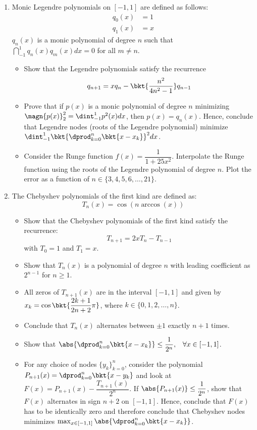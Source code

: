 \documentclass{article}
\begin{document}
	\begin{enumerate}
		\item
		Monic Legendre polynomials on $[-1,1]$ are defined as follows:
		\begin{align}
			q_0(x) & = 1\\
			q_1(x) & = x
		\end{align}
		$q_n(x)$ is a monic polynomial of degree $n$ such that $\dint_{-1}^1 q_n(x) q_m(x)dx = 0$ for all $m \neq n$.
		\begin{itemize}
			\item
			Show that the Legendre polynomials satisfy the recurrence
			$$q_{n+1} = xq_n - \bkt{\dfrac{n^2}{4n^2-1}}q_{n-1}$$
			\item
			Prove that if $p(x)$ is a monic polynomial of degree $n$ minimizing $\magn{p(x)}_2^2 = \dint_{-1}^1 p^2(x)dx$, then $p(x) = q_n(x)$. Hence, conclude that Legendre nodes (roots of the Legendre polynomial) minimize $\dint_{-1}^1\bkt{\dprod_{k=0}^n \bkt{x-x_k}}^2 dx$.
			\item
			Consider the Runge function $f(x) = \dfrac1{1+25x^2}$. Interpolate the Runge function using the roots of the Legendre polynomial of degree $n$. Plot the error as a function of $n \in \{3,4,5,6,\ldots,21\}$.
		\end{itemize}
		\item
		The Chebyshev polynomials of the first kind are defined as:
		$$T_n(x) = \cos(n \arccos(x))$$
		\begin{itemize}
			\item
			Show that the Chebyshev polynomials of the first kind satisfy the recurrence:
			$$T_{n+1} = 2xT_n - T_{n-1}$$
			with $T_0 = 1$ and $T_1 = x$.
			\item
			Show that $T_n(x)$ is a polynomial of degree $n$ with leading coefficient as $2^{n-1}$ for $n \geq 1$.
			\item
			All zeros of $T_{n+1}(x)$ are in the interval $[-1,1]$ and given by $x_k = \cos\bkt{\dfrac{2k+1}{2n+2}\pi}$, where $k \in \{0,1,2,\ldots,n\}$.
			\item
			Conclude that $T_n(x)$ alternates between $\pm1$ exactly $n+1$ times.
			\item
			Show that $\abs{\dprod_{k=0}^n \bkt{x-x_k}} \leq \dfrac1{2^n}, \,\,\,\,\, \forall x \in [-1,1]$.
			\item
			For any choice of nodes $\{y_k\}_{k=0}^n$, consider the polynomial $P_{n+1}(x) = \dprod_{k=0}^n \bkt{x-y_k}$ and look at $F(x) = P_{n+1}(x) - \dfrac{T_{n+1}(x)}{2^n}$. If $\abs{P_{n+1}(x)} \leq \dfrac1{2^n}$, show that $F(x)$ alternates in sign $n+2$ on $[-1,1]$. Hence, conclude that $F(x)$ has to be identically zero and therefore conclude that Chebyshev nodes minimizes $\max_{x \in [-1,1]}\abs{\dprod_{k=0}^n \bkt{x-x_k}}$.
		\end{itemize}
	\end{enumerate}
\end{document}
